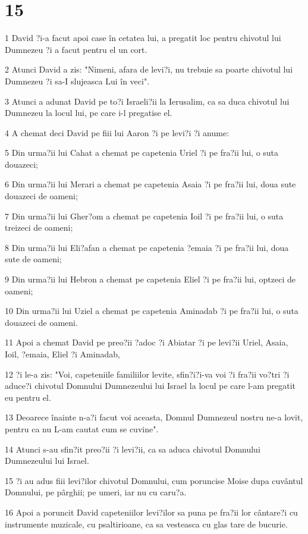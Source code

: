 \chapter{15}

\par 1 David ?i-a facut apoi case în cetatea lui, a pregatit loc pentru chivotul lui Dumnezeu ?i a facut pentru el un cort.
\par 2 Atunci David a zis: "Nimeni, afara de levi?i, nu trebuie sa poarte chivotul lui Dumnezeu ?i sa-I slujeasca Lui în veci".
\par 3 Atunci a adunat David pe to?i Israeli?ii la Ierusalim, ca sa duca chivotul lui Dumnezeu la locul lui, pe care i-l pregatise el.
\par 4 A chemat deci David pe fiii lui Aaron ?i pe levi?i ?i anume:
\par 5 Din urma?ii lui Cahat a chemat pe capetenia Uriel ?i pe fra?ii lui, o suta douazeci;
\par 6 Din urma?ii lui Merari a chemat pe capetenia Asaia ?i pe fra?ii lui, doua sute douazeci de oameni;
\par 7 Din urma?ii lui Gher?om a chemat pe capetenia Ioil ?i pe fra?ii lui, o suta treizeci de oameni;
\par 8 Din urma?ii lui Eli?afan a chemat pe capetenia ?emaia ?i pe fra?ii lui, doua sute de oameni;
\par 9 Din urma?ii lui Hebron a chemat pe capetenia Eliel ?i pe fra?ii lui, optzeci de oameni;
\par 10 Din urma?ii lui Uziel a chemat pe capetenia Aminadab ?i pe fra?ii lui, o suta douazeci de oameni.
\par 11 Apoi a chemat David pe preo?ii ?adoc ?i Abiatar ?i pe levi?ii Uriel, Asaia, Ioil, ?emaia, Eliel ?i Aminadab,
\par 12 ?i le-a zis: "Voi, capeteniile familiilor levite, sfin?i?i-va voi ?i fra?ii vo?tri ?i aduce?i chivotul Domnului Dumnezeului lui Israel la locul pe care l-am pregatit eu pentru el.
\par 13 Deoarece înainte n-a?i facut voi aceasta, Domnul Dumnezeul nostru ne-a lovit, pentru ca nu L-am cautat cum se cuvine".
\par 14 Atunci s-au sfin?it preo?ii ?i levi?ii, ca sa aduca chivotul Domnului Dumnezeului lui Israel.
\par 15 ?i au adus fiii levi?ilor chivotul Domnului, cum poruncise Moise dupa cuvântul Domnului, pe pârghii; pe umeri, iar nu cu caru?a.
\par 16 Apoi a poruncit David capeteniilor levi?ilor sa puna pe fra?ii lor cântare?i cu instrumente muzicale, cu psaltirioane, ca sa vesteasca cu glas tare de bucurie.

